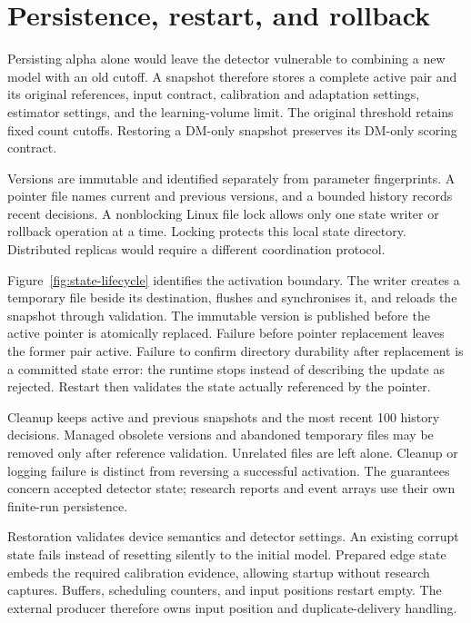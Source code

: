 \section{Persistence, restart, and rollback}
\label{sec:state}

Persisting alpha alone would leave the detector vulnerable to combining a
new model with an old cutoff. A snapshot therefore stores a complete
active pair and its original references, input contract, calibration and
adaptation settings, estimator settings, and the learning-volume limit.
The original threshold retains fixed count cutoffs. Restoring a DM-only
snapshot preserves its DM-only scoring contract.

Versions are immutable and identified separately from parameter
fingerprints. A pointer file names current and previous versions, and a
bounded history records recent decisions. A nonblocking Linux file lock
allows only one state writer or rollback operation at a time. Locking
protects this local state directory. Distributed replicas would require a
different coordination protocol.

Figure~\ref{fig:state-lifecycle} identifies the activation boundary. The
writer creates a temporary file beside its destination, flushes and
synchronises it, and reloads the snapshot through validation. The immutable
version is published before the active pointer is atomically replaced.
Failure before pointer replacement leaves the former pair active.
Failure to confirm directory durability after replacement is a committed
state error: the runtime stops instead of describing the update as rejected.
Restart then validates the state actually referenced by the pointer.



Cleanup keeps active and previous snapshots and the most recent 100
history decisions. Managed obsolete versions and abandoned temporary
files may be removed only after reference validation. Unrelated files are
left alone. Cleanup or logging failure is distinct from reversing a
successful activation. The guarantees concern accepted detector state;
research reports and event arrays use their own finite-run persistence.

Restoration validates device semantics and detector settings. An existing
corrupt state fails instead of resetting silently to the initial model.
Prepared edge state embeds the required calibration evidence, allowing
startup without research captures. Buffers, scheduling counters, and input
positions restart empty. The external producer therefore owns input position
and duplicate-delivery handling.

